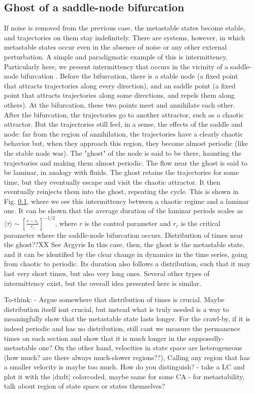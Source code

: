 \documentclass[preprint,superscriptaddress,showpacs,amsmath,amssymb,aps,pre,floatfix]{revtex4-1}
\theoremstyle{definition}
\begin{document}
\subsection{Ghost of a saddle-node bifurcation}
If noise is removed from the previous case, the metastable states become stable, and trajectories on them stay indefinitely. There are systems, however, in which metastable states occur even in the absence of noise or any other external perturbation. A simple and paradigmatic example of this is intermittency. Particularly here, we present intermittency that occurs in the vicinity of a saddle-node bifurcation \cite{}. Before the bifurcation, there is a stable node (a fixed point that attracts trajectories along every direction), and an saddle point (a fixed point that attracts trajectories along some directions, and repels them along others). At the bifurcation, these two points meet and annihilate each other. After the bifurcation, the trajectories go to another attractor, such as a chaotic attractor. But the trajectories still feel, in a sense, the effects of the saddle and node: far from the region of annihilation, the trajectories have a clearly chaotic behavior but, when they approach this region, they become almost periodic (like the stable node was). The "ghost" of the node is said to be there, haunting the trajectories and making them almost periodic. The flow near the ghost is said to be laminar, in analogy with fluids. The ghost retains the trajectories for some time, but they eventually escape and visit the chaotic attractor. It then eventually reinjects them into the ghost, repeating the cycle.  This is shown in Fig. \ref{}, where we see this intermittency between a chaotic regime and a laminar one. It can be shown that the average duration of the laminar periods scales as $\langle \tau \rangle \sim [\frac{r - r_c}{r_c} ]^{-1/2}$, where $r$ is the control parameter and $r_c$ is the critical parameter where the saddle-node bifurcation occurs. 
Distribution of times near the ghost??XX See Argyris
In this case, then, the ghost is the metastable state, and it can be identified by the clear change in dynamics in the time series, going from chaotic to periodic. Its duration also follows a distribution, such that it may last very short times, but also very long ones.
Several other types of intermittency exist, but the overall idea presented here is similar.

To-think:
- Argue somewhere that distribution of times is crucial. Maybe distribution itself isnt crucial, but instead what is truly needed is a way to meaningfully show that the metastable state lasts longer. For the crawl-by, if it is indeed periodic and has no distribution, still cant we measure the permanence times on each section and show that it is much longer in the supposedly-metastable one? On the other hand, velocities in state space are heterogeneous (how much? are there always much-slower regions??), Calling any region that has a smaller velocity is maybe too much. How do you distinguish? 
    - take a LC and plot it with the |dxdt| colorcoded, maybe same for some CA
- for metastability, talk about region of state space or states themselves?
\end{document}
